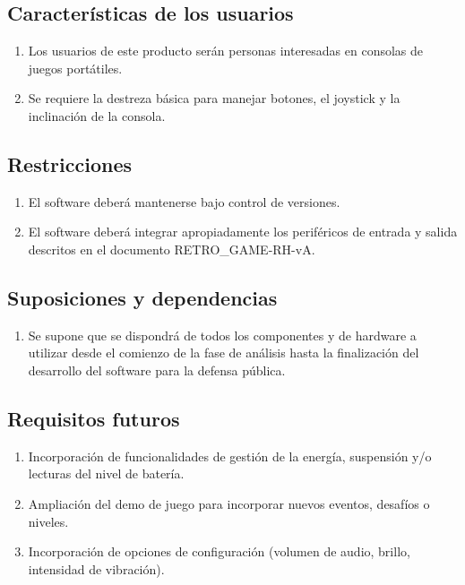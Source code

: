 \documentclass[11pt,a4paper]{article}
\begin{document}
\subsection{Características de los usuarios}
\label{sec:orga40b0ee}

\begin{enumerate}
  \item Los usuarios de este producto serán personas interesadas en consolas de juegos portátiles. 
  \item Se requiere la destreza básica para manejar botones, el joystick y la inclinación de la consola.
\end{enumerate}


\subsection{Restricciones}
\label{sec:org5ca5790}

\begin{enumerate}
  \item El software deberá mantenerse bajo control de versiones.
  \item El software deberá integrar apropiadamente los periféricos de entrada y salida descritos en el documento RETRO\_GAME-RH-vA.
\end{enumerate}


\subsection{Suposiciones y dependencias}
\label{sec:org0ae23fe}

\begin{enumerate}
  \item Se supone que se dispondrá de todos los componentes y de hardware a utilizar desde el comienzo de la fase de análisis hasta la finalización del desarrollo del software para la defensa pública.
\end{enumerate}


\subsection{Requisitos futuros}
\label{sec:org33cfcdb}

\begin{enumerate}
  \item Incorporación de funcionalidades de gestión de la energía, suspensión y/o lecturas del nivel de batería.
  \item Ampliación del demo de juego para incorporar nuevos eventos, desafíos o niveles.
  \item Incorporación de opciones de configuración (volumen de audio, brillo, intensidad de vibración).
\end{enumerate} 
\end{document}
